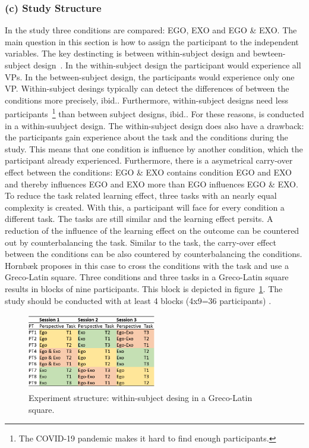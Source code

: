 \subsubsection{(c) Study Structure}
In the study three conditions are compared: EGO, EXO and EGO \& EXO. The main question in this section is how to assign the participant to the independent variables. The key destincting is between within-subject design and bewteen-subject design~\cite{hornbaek}. In the within-subject design the participant would experience all VPs. In the between-subject design, the participants would experience only one VP. Within-subject desings typically can detect the differences of between the conditions more precisely, ibid.. Furthermore, within-subject designs need less participants~\footnote{The COVID-19 pandemic makes it hard to find enough participants.} than between subject designs, ibid.. For these reasons, is conducted in a within-suubject design. The within-subject design does also have a drawback: the participants gain experience about the task and the conditions during the study. This means that one condition is influence by another condition, which the participant already experienced. Furthermore, there is a asymetrical carry-over effect between the conditions: EGO \& EXO contains condition EGO and EXO and thereby influences EGO and EXO more than EGO influences EGO \& EXO. To reduce the task related learning effect, three tasks with an nearly equal complexity is created. With this, a participant will face for every condition a different task. The tasks are still similar and the learning effect persits. A reduction of the influence of the learning effect on the outcome can be countered out by counterbalancing the task. Similar to the task, the carry-over effect between the conditions can be also countered by counterbalancing the conditions. Hornb\ae{}k proposes in this case to cross the conditions with the task and use a Greco-Latin square. Three conditions and three tasks in a Greco-Latin square results in blocks of nine participants. This block is depicted in figure~\ref{fig:study_session_plan}. The study should be conducted with at least 4 blocks (4x9=36 participants) .

\begin{figure}[htb]
	\centering
	\includegraphics[width=0.5\textwidth]{figures/study_session_plan.png}
	\caption[Study structure]{Experiment structure: within-subject desing in a Greco-Latin square.}
	\label{fig:study_session_plan}
\end{figure}

